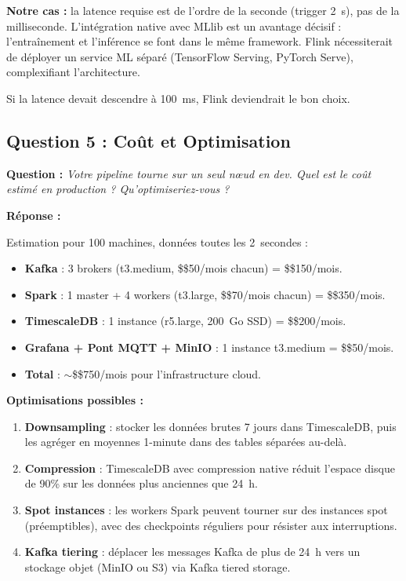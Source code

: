 \documentclass[11pt,a4paper]{article}
\begin{document}
\textbf{Notre cas :} la latence requise est de l'ordre de la seconde (trigger 2~s), pas de la milliseconde. L'intégration native avec MLlib est un avantage décisif : l'entraînement et l'inférence se font dans le même framework. Flink nécessiterait de déployer un service ML séparé (TensorFlow Serving, PyTorch Serve), complexifiant l'architecture.

Si la latence devait descendre à 100~ms, Flink deviendrait le bon choix.

\subsection{Question 5 : Coût et Optimisation}

\textbf{Question :} \textit{Votre pipeline tourne sur un seul nœud en dev. Quel est le coût estimé en production ? Qu'optimiseriez-vous ?}

\textbf{Réponse :}

Estimation pour 100 machines, données toutes les 2~secondes :

\begin{itemize}
    \item \textbf{Kafka} : 3 brokers (t3.medium, \$\$50/mois chacun) = \$\$150/mois.
    \item \textbf{Spark} : 1 master + 4 workers (t3.large, \$\$70/mois chacun) = \$\$350/mois.
    \item \textbf{TimescaleDB} : 1 instance (r5.large, 200~Go SSD) = \$\$200/mois.
    \item \textbf{Grafana + Pont MQTT + MinIO} : 1 instance t3.medium = \$\$50/mois.
    \item \textbf{Total} : $\sim$\$\$750/mois pour l'infrastructure cloud.
\end{itemize}

\textbf{Optimisations possibles :}
\begin{enumerate}
    \item \textbf{Downsampling} : stocker les données brutes 7 jours dans TimescaleDB, puis les agréger en moyennes 1-minute dans des tables séparées au-delà.
    \item \textbf{Compression} : TimescaleDB avec compression native réduit l'espace disque de 90\% sur les données plus anciennes que 24~h.
    \item \textbf{Spot instances} : les workers Spark peuvent tourner sur des instances spot (préemptibles), avec des checkpoints réguliers pour résister aux interruptions.
    \item \textbf{Kafka tiering} : déplacer les messages Kafka de plus de 24~h vers un stockage objet (MinIO ou S3) via Kafka tiered storage.
\end{enumerate}
\end{document}
